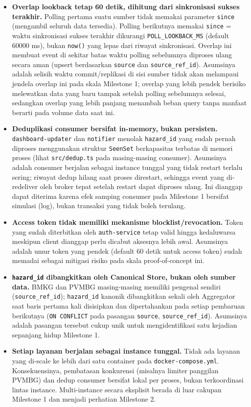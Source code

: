 \begin{itemize}
  \item \textbf{Overlap lookback tetap 60 detik, dihitung dari sinkronisasi sukses
  terakhir.} Polling pertama suatu sumber tidak memakai parameter \texttt{since}
  (mengambil seluruh data tersedia). Polling berikutnya memakai
  \texttt{since} = waktu sinkronisasi sukses terakhir dikurangi
  \texttt{POLL\_LOOKBACK\_MS} (default 60000 ms), bukan \texttt{now()} yang lepas
  dari riwayat sinkronisasi. Overlap ini membuat event di sekitar batas waktu
  polling sebelumnya diproses ulang secara aman (upsert berdasarkan
  \texttt{source} dan \texttt{source\_ref\_id}). Asumsinya adalah selisih waktu
  commit/replikasi di sisi sumber tidak akan melampaui jendela overlap ini pada
  skala Milestone 1; overlap yang lebih pendek berisiko melewatkan data yang
  baru tampak setelah polling sebelumnya selesai, sedangkan overlap yang lebih
  panjang menambah beban query tanpa manfaat berarti pada volume data saat ini.
  \item \textbf{Deduplikasi consumer bersifat in-memory, bukan persisten.}
  \texttt{dashboard-updater} dan \texttt{notifier} menolak \texttt{hazard\_id}
  yang sudah pernah diproses menggunakan struktur \texttt{SeenSet} berkapasitas
  terbatas di memori proses (lihat \texttt{src/dedup.ts} pada masing-masing
  consumer). Asumsinya adalah consumer berjalan sebagai instance tunggal yang
  tidak restart terlalu sering; riwayat dedup hilang saat proses direstart,
  sehingga event yang di-redeliver oleh broker tepat setelah restart dapat
  diproses ulang. Ini dianggap dapat diterima karena efek samping consumer pada
  Milestone 1 bersifat simulasi (log), bukan transaksi yang tidak boleh terulang.
  \item \textbf{Access token tidak memiliki mekanisme blocklist/revocation.}
  Token yang sudah diterbitkan oleh \texttt{auth-service} tetap valid hingga
  kedaluwarsa meskipun client dianggap perlu dicabut aksesnya lebih awal.
  Asumsinya adalah umur token yang pendek (default 60 detik untuk access token)
  sudah memadai sebagai mitigasi risiko pada skala proof-of-concept ini.
  \item \textbf{\texttt{hazard\_id} dibangkitkan oleh Canonical Store, bukan oleh
  sumber data.} BMKG dan PVMBG masing-masing memiliki pengenal sendiri
  (\texttt{source\_ref\_id}); \texttt{hazard\_id} kanonik dibangkitkan sekali
  oleh Aggregator saat baris pertama kali disisipkan dan dipertahankan pada
  setiap pembaruan berikutnya (\texttt{ON CONFLICT} pada pasangan
  \texttt{source}, \texttt{source\_ref\_id}). Asumsinya adalah pasangan tersebut
  cukup unik untuk mengidentifikasi satu kejadian sepanjang hidup Milestone 1.
  \item \textbf{Setiap layanan berjalan sebagai instance tunggal.} Tidak ada
  layanan yang di-scale ke lebih dari satu container pada \texttt{docker-compose.yml}.
  Konsekuensinya, pembatasan konkurensi (misalnya limiter panggilan PVMBG) dan
  dedup consumer bersifat lokal per proses, bukan terkoordinasi lintas instance.
  Multi-instance secara eksplisit berada di luar cakupan Milestone 1 dan menjadi
  perhatian Milestone 2.
\end{itemize}

